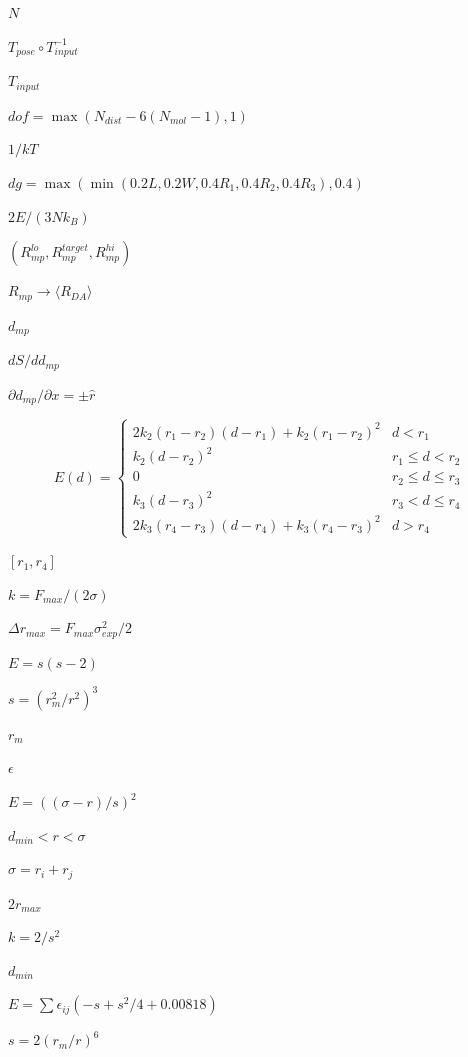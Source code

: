 \documentclass{article}
\begin{document}
$N$
\pagebreak

$T_{pose} \circ T_{input}^{-1}$
\pagebreak

$T_{input}$
\pagebreak

$dof = \max(N_{dist} - 6(N_{mol}-1), 1)$
\pagebreak

$1/kT$
\pagebreak

$dg = \max(\min(0.2L, 0.2W, 0.4R_1, 0.4R_2, 0.4R_3),
0.4)$
\pagebreak

$2E/(3Nk_B)$
\pagebreak

$(R_{mp}^{lo}, R_{mp}^{target}, R_{mp}^{hi})$
\pagebreak

$R_{mp} \to \langle R_{DA}\rangle$
\pagebreak

$d_{mp}$
\pagebreak

$dS/dd_{mp}$
\pagebreak

$\partial d_{mp}/\partial x = \pm\hat r$
\pagebreak

\[E(d) = \begin{cases}
  2k_2(r_1-r_2)(d-r_1) + k_2(r_1-r_2)^2 & d < r_1 \\
  k_2 (d-r_2)^2                         & r_1 \le d < r_2 \\
  0                                     & r_2 \le d \le r_3 \\
  k_3 (d-r_3)^2                         & r_3 < d \le r_4 \\
  2k_3(r_4-r_3)(d-r_4) + k_3(r_4-r_3)^2 & d > r_4
\end{cases}
\]
\pagebreak

$[r_1, r_4]$
\pagebreak

$k = F_{max} / (2\sigma)$
\pagebreak

$\Delta r_{max} = F_{max}\sigma_{exp}^2/2$
\pagebreak

$E = s(s - 2)$
\pagebreak

$s = (r_m^2/r^2)^3$
\pagebreak

$r_m$
\pagebreak

$\epsilon$
\pagebreak

$E = ((\sigma - r)/s)^2$
\pagebreak

$d_{min} < r < \sigma$
\pagebreak

$\sigma = r_i + r_j$
\pagebreak

$2 r_{max}$
\pagebreak

$k = 2/s^2$
\pagebreak

$d_{min}$
\pagebreak

$E = \sum \epsilon_{ij}(-s + s^2/4 + 0.00818)$
\pagebreak

$s = 2(r_m/r)^6$
\pagebreak
\end{document}
